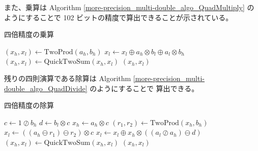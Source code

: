 また、乗算は
Algorithm \ref{more-precision_multi-double_algo_QuadMultiply} のようにすることで
102 ビットの精度で算出できることが示されている\cite{Naoya2012}。

\begin{algorithm}[tp]
    \caption{四倍精度の乗算\cite{Hisashi2006,Naoya2012}}
    \label{more-precision_multi-double_algo_QuadMultiply}
    \begin{algorithmic}
        \State $(x_h, x_l) \gets \text{TwoProd}(a_h, b_h)$
        \State $x_l \gets x_l \oplus a_h \otimes b_l \oplus a_l \otimes b_h$
        \State $(x_h, x_l) \gets \text{QuickTwoSum}(x_h, x_l)$
        \State \Return $(x_h, x_l)$
        \EndProcedure
    \end{algorithmic}
\end{algorithm}

残りの四則演算である除算は
Algorithm \ref{more-precision_multi-double_algo_QuadDivide} のようにすることで
算出できる\cite{Naoya2012s}。

\begin{algorithm}[tp]
    \caption{四倍精度の除算\cite{Naoya2012s}}
    \label{more-precision_multi-double_algo_QuadDivide}
    \begin{algorithmic}
        \State $c \gets 1 \oslash b_h$
        \State $d \gets b_l \otimes c$
        \State $x_h \gets a_h \otimes c$
        \State $(r_1, r_2) \gets \text{TwoProd}(x_h, b_h)$
        \State $x_l \gets ((a_h \ominus r_1) \ominus r_2) \otimes c$
        \State $x_l \gets x_l \oplus x_h \otimes ((a_l \oslash a_h) \ominus d)$
        \State $(x_h, x_l) \gets \text{QuickTwoSum}(x_h, x_l)$
        \State \Return $(x_h, x_l)$
        \EndProcedure
    \end{algorithmic}
\end{algorithm}
